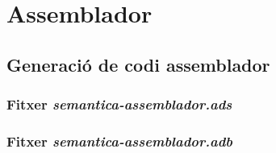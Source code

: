 \section{Assemblador}
\subsection{Generació de codi assemblador}
\subsubsection{Fitxer \emph{semantica-assemblador.ads}}

\newpage

\subsubsection{Fitxer \emph{semantica-assemblador.adb}}

\newpage
